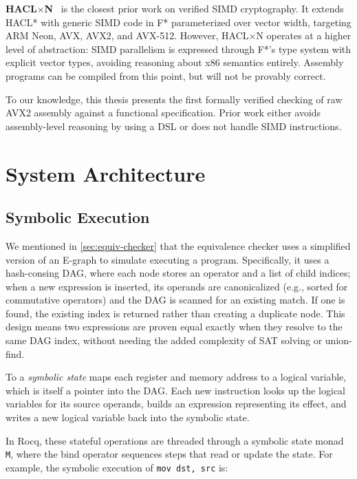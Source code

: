 \textbf{HACL$\times$N}~\autocite{haclxn2020} is the closest prior work on verified SIMD cryptography.
It extends HACL* with generic SIMD code in F* parameterized over vector width, targeting ARM Neon, AVX, AVX2, and AVX-512.
However, HACL$\times$N operates at a higher level of abstraction: SIMD parallelism is expressed through F*'s type system with explicit vector types, avoiding reasoning about x86 semantics entirely. Assembly programs can be compiled from this point, but will not be provably correct.


To our knowledge, this thesis presents the first formally verified checking of raw AVX2 assembly against a functional specification. Prior work either avoids assembly-level reasoning by using a DSL or does not handle SIMD instructions.



\chapter{System Architecture}
\label{ch:architecture}

\section{Symbolic Execution}

We mentioned in \autoref{sec:equiv-checker} that the equivalence checker uses a simplified version of an E-graph to simulate executing a program.
Specifically, it uses a hash-consing DAG, where each node stores an operator and a list of child indices; when a new expression is inserted, its operands are canonicalized (e.g., sorted for commutative operators) and the DAG is scanned for an existing match.
If one is found, the existing index is returned rather than creating a duplicate node.
This design means two expressions are proven equal exactly when they resolve to the same DAG index, without needing the added complexity of SAT solving or union-find.

To  a \textit{symbolic state} maps each register and memory address to a logical variable, which is itself a pointer into the DAG. Each new instruction looks up the logical variables for its source operands, builds an expression representing its effect, and writes a new logical variable back into the symbolic state.

In Rocq, these stateful operations are threaded through a symbolic state monad \texttt{M}, where the bind operator \bind{} sequences steps that read or update the state.
For example, the symbolic execution of \texttt{mov dst, src} is:

